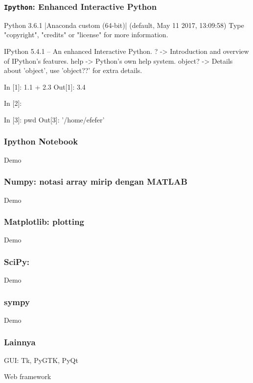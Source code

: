 \begin{frame}[fragile]
\frametitle{\texttt{Ipython}: Enhanced Interactive Python}

\begin{textcode}
Python 3.6.1 |Anaconda custom (64-bit)| (default, May 11 2017, 13:09:58) 
Type "copyright", "credits" or "license" for more information.

IPython 5.4.1 -- An enhanced Interactive Python.
?         -> Introduction and overview of IPython's features.
help      -> Python's own help system.
object?   -> Details about 'object', use 'object??' for extra details.

In [1]: 1.1 + 2.3
Out[1]: 3.4

In [2]: %

In [3]: pwd
Out[3]: '/home/efefer'
\end{textcode}

\end{frame}

\begin{frame}
\frametitle{Ipython Notebook}

Demo

\end{frame}


\begin{frame}[fragile]
\frametitle{Numpy: notasi array mirip dengan MATLAB}

Demo

\end{frame}


\begin{frame}[fragile]
\frametitle{Matplotlib: plotting}
  
Demo
  
\end{frame}

\begin{frame}[fragile]
\frametitle{SciPy:}

Demo

\end{frame}


\begin{frame}[fragile]
\frametitle{sympy}
  
Demo
  
\end{frame}


\begin{frame}[fragile]
\frametitle{Lainnya}
    
GUI: Tk, PyGTK, PyQt

Web framework

\end{frame}



